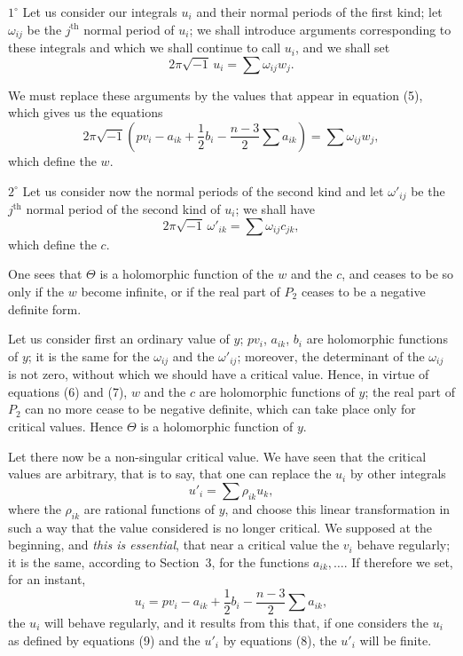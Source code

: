 \documentclass{article}
\begin{document}
$1^\circ$ Let us consider our integrals $u_{i}$ and their normal periods of the first kind; let $\omega_{ij}$ be the $j^{\text{th}}$ normal period of $u_{i}$; we shall introduce arguments corresponding to these integrals and which we shall continue to call $u_{i}$, and we shall set
\[
2 \pi \sqrt{-1} \, u_{i} = \sum \omega_{ij} w_{j}.
\]

We must replace these arguments by the values that appear in equation (5), which gives us the equations
\[
2 \pi \sqrt{-1} \left( p v_{i} - a_{ik} + \frac{1}{2} b_{i} - \frac{n - 3}{2} \sum a_{ik} \right) = \sum \omega_{ij} w_{j}, \tag{6}
\]
which define the $w$.

$2^\circ$ Let us consider now the normal periods of the second kind and let $\omega'_{ij}$ be the $j^{\text{th}}$ normal period of the second kind of $u_{i}$; we shall have
\[
2 \pi \sqrt{-1} \, \omega'_{ik} = \sum \omega_{ij} c_{jk}, \tag{7}
\]
which define the $c$.

One sees that $\Theta$ is a holomorphic function of the $w$ and the $c$, and ceases to be so only if the $w$ become infinite, or if the real part of $P_{2}$ ceases to be a negative definite form.

Let us consider first an ordinary value of $y$; $p v_{i}$, $a_{ik}$, $b_{i}$ are holomorphic functions of $y$; it is the same for the $\omega_{ij}$ and the $\omega'_{ij}$; moreover, the determinant of the $\omega_{ij}$ is not zero, without which we should have a critical value. Hence, in virtue of equations (6) and (7), $w$ and the $c$ are holomorphic functions of $y$; the real part of $P_{2}$ can no more cease to be negative definite, which can take place only for critical values. Hence $\Theta$ is a holomorphic function of $y$.

Let there now be a non-singular critical value. We have seen that the critical values are arbitrary, that is to say, that one can replace the $u_{i}$ by other integrals
\[
u'_{i} = \sum \rho_{ik} u_{k}, \tag{8}
\]
where the $\rho_{ik}$ are rational functions of $y$, and choose this linear transformation in such a way that the value considered is no longer critical. We supposed at the beginning, and \emph{this is essential}, that near a critical value the $v_{i}$ behave regularly; it is the same, according to Section~3, for the functions $a_{ik}, \ldots$. If therefore we
set, for an instant,
\[
u_{i} = p v_{i} - a_{ik} + \frac{1}{2} b_{i} - \frac{n - 3}{2} \sum a_{ik}, \tag{9}
\]
the $u_{i}$ will behave regularly, and it results from this that, if one considers the $u_{i}$ as defined by equations (9) and the $u'_{i}$ by equations (8), the $u'_{i}$ will be finite.
\end{document}
